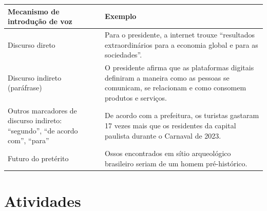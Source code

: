 \begin{longtable}[]{@{}ll@{}}
\toprule
\begin{minipage}[b]{0.46\columnwidth}\raggedright
\textbf{Mecanismo de introdução de voz}\strut
\end{minipage} & \begin{minipage}[b]{0.46\columnwidth}\raggedright
\textbf{Exemplo}\strut
\end{minipage}\tabularnewline
\midrule
\endhead
\begin{minipage}[t]{0.46\columnwidth}\raggedright
Discurso direto\strut
\end{minipage} & \begin{minipage}[t]{0.46\columnwidth}\raggedright
Para o presidente, a internet trouxe ``resultados extraordinários para a
economia global e para as sociedades''.\strut
\end{minipage}\tabularnewline
\begin{minipage}[t]{0.46\columnwidth}\raggedright
Discurso indireto (paráfrase)\strut
\end{minipage} & \begin{minipage}[t]{0.46\columnwidth}\raggedright
O presidente afirma que as plataformas digitais definiram a maneira como
as pessoas se comunicam, se relacionam e como consomem produtos e
serviços.\strut
\end{minipage}\tabularnewline
\begin{minipage}[t]{0.46\columnwidth}\raggedright
Outros marcadores de discurso indireto: ``segundo'', ``de acordo com'',
``para''\strut
\end{minipage} & \begin{minipage}[t]{0.46\columnwidth}\raggedright
De acordo com a prefeitura, os turistas gastaram 17 vezes mais que os
residentes da capital paulista durante o Carnaval de 2023.\strut
\end{minipage}\tabularnewline
\begin{minipage}[t]{0.46\columnwidth}\raggedright
Futuro do pretérito\strut
\end{minipage} & \begin{minipage}[t]{0.46\columnwidth}\raggedright
Ossos encontrados em sítio arqueológico brasileiro seriam de um homem
pré-histórico.\strut
\end{minipage}\tabularnewline
\bottomrule
\end{longtable}

\section*{Atividades}

